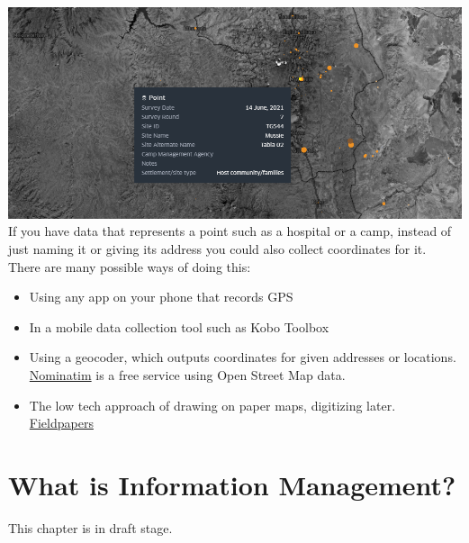 \documentclass[
  a4paper,
  onecolumn,
  oneside]{book}
\begin{document}
\includegraphics{part1/./images/pointdata.png}\\
If you have data that represents a point such as a hospital or a camp,
instead of just naming it or giving its address you could also collect
coordinates for it. There are many possible ways of doing this:

\begin{itemize}
\item
  Using any app on your phone that records GPS
\item
  In a mobile data collection tool such as Kobo Toolbox
\item
  Using a geocoder, which outputs coordinates for given addresses or
  locations. \href{http://nominatim.openstreetmap.org/}{Nominatim} is a
  free service using Open Street Map data.
\item
  The low tech approach of drawing on paper maps, digitizing later.
  \href{is\%20a\%20good\%20tool\%20for\%20this}{Fieldpapers}
\end{itemize}

\hypertarget{what-is-information-management}{%
\chapter{What is Information
Management?}\label{what-is-information-management}}

\begin{tcolorbox}[enhanced jigsaw, left=2mm, rightrule=.15mm, arc=.35mm, coltitle=black, opacityback=0, colframe=quarto-callout-warning-color-frame, breakable, toprule=.15mm, titlerule=0mm, leftrule=.75mm, opacitybacktitle=0.6, title=\textcolor{quarto-callout-warning-color}{\faExclamationTriangle}\hspace{0.5em}{Warning}, bottomtitle=1mm, toptitle=1mm, bottomrule=.15mm, colbacktitle=quarto-callout-warning-color!10!white, colback=white]

This chapter is in draft stage.

\end{tcolorbox}
\end{document}
